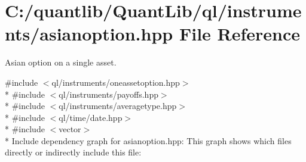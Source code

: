 \section{C\+:/quantlib/\+Quant\+Lib/ql/instruments/asianoption.hpp File Reference}
\label{asianoption_8hpp}


Asian option on a single asset.  


{\ttfamily \#include $<$ql/instruments/oneassetoption.\+hpp$>$}\\*
{\ttfamily \#include $<$ql/instruments/payoffs.\+hpp$>$}\\*
{\ttfamily \#include $<$ql/instruments/averagetype.\+hpp$>$}\\*
{\ttfamily \#include $<$ql/time/date.\+hpp$>$}\\*
{\ttfamily \#include $<$vector$>$}\\*
Include dependency graph for asianoption.\+hpp\+:
This graph shows which files directly or indirectly include this file\+:
